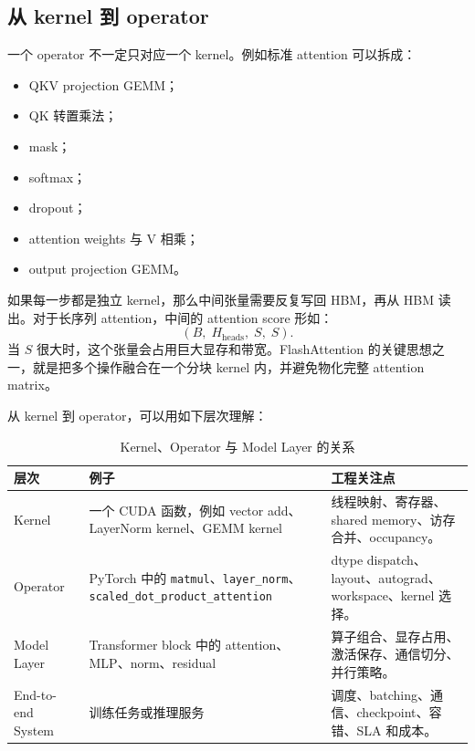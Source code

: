 \subsection{从 kernel 到 operator}
\label{subsec:from-kernel-to-operator}

一个 operator 不一定只对应一个 kernel。例如标准 attention 可以拆成：

\begin{itemize}
  \item QKV projection GEMM；
  \item QK 转置乘法；
  \item mask；
  \item softmax；
  \item dropout；
  \item attention weights 与 V 相乘；
  \item output projection GEMM。
\end{itemize}

如果每一步都是独立 kernel，那么中间张量需要反复写回 HBM，再从 HBM 读出。对于长序列 attention，中间的 attention score 形如：
\[
  (B,\;H_{\mathrm{heads}},\;S,\;S).
\]
当 $S$ 很大时，这个张量会占用巨大显存和带宽。FlashAttention 的关键思想之一，就是把多个操作融合在一个分块 kernel 内，并避免物化完整 attention matrix。

从 kernel 到 operator，可以用如下层次理解：

\begin{table}[H]
  \centering
  \small
  \caption{Kernel、Operator 与 Model Layer 的关系}
  \label{tab:kernel-operator-layer}
  \begin{tabular}{p{}p{}p{}}
    \toprule
    \textbf{层次} & \textbf{例子} & \textbf{工程关注点} \\
    \midrule
    Kernel
    & 一个 CUDA 函数，例如 vector add、LayerNorm kernel、GEMM kernel
    & 线程映射、寄存器、shared memory、访存合并、occupancy。 \\
    \midrule
    Operator
    & PyTorch 中的 \texttt{matmul}、\texttt{layer\_norm}、\texttt{scaled\_dot\_product\_attention}
    & dtype dispatch、layout、autograd、workspace、kernel 选择。 \\
    \midrule
    Model Layer
    & Transformer block 中的 attention、MLP、norm、residual
    & 算子组合、显存占用、激活保存、通信切分、并行策略。 \\
    \midrule
    End-to-end System
    & 训练任务或推理服务
    & 调度、batching、通信、checkpoint、容错、SLA 和成本。 \\
    \bottomrule
  \end{tabular}
\end{table}


